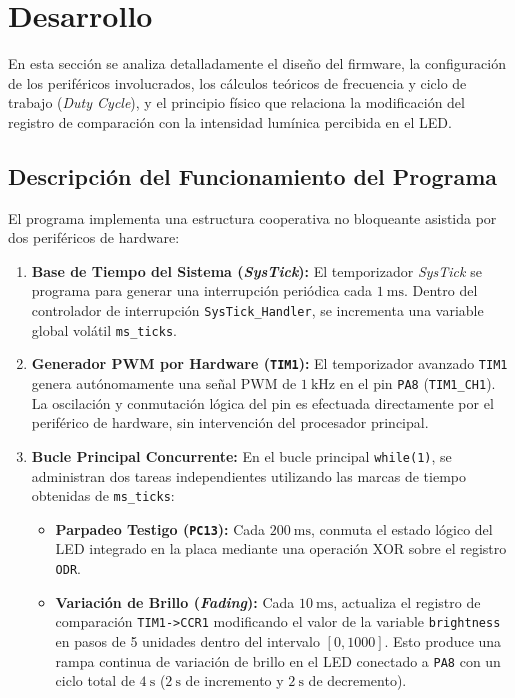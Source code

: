 \chapter{Desarrollo}
\label{ch.ej5:desarrollo}

En esta sección se analiza detalladamente el diseño del firmware, la configuración de los periféricos involucrados,
los cálculos teóricos de frecuencia y ciclo de trabajo (\textit{Duty Cycle}), y el principio físico que relaciona la
modificación del registro de comparación con la intensidad lumínica percibida en el LED.

\section{Descripción del Funcionamiento del Programa}
\label{sec.ej5:funcionamiento}

El programa implementa una estructura cooperativa no bloqueante asistida por dos periféricos de hardware:
\begin{enumerate}
    \item \textbf{Base de Tiempo del Sistema (\textit{SysTick}):} El temporizador \textit{SysTick} se programa para
    generar una interrupción periódica cada $\qty{1}{\ms}$. Dentro del controlador de interrupción
    \lstinline{SysTick_Handler}, se incrementa una variable global volátil \lstinline{ms_ticks}.
    \item \textbf{Generador PWM por Hardware (\texttt{TIM1}):} El temporizador avanzado \texttt{TIM1} genera autónomamente
    una señal PWM de $\qty{1}{\kHz}$ en el pin \texttt{PA8} (\texttt{TIM1\_CH1}). La oscilación y conmutación lógica
    del pin es efectuada directamente por el periférico de hardware, sin intervención del procesador principal.
    \item \textbf{Bucle Principal Concurrente:} En el bucle principal \lstinline{while(1)}, se administran dos tareas
    independientes utilizando las marcas de tiempo obtenidas de \lstinline{ms_ticks}:
    \begin{itemize}
        \item \textbf{Parpadeo Testigo (\texttt{PC13}):} Cada $\qty{200}{\ms}$, conmuta el estado lógico del LED
        integrado en la placa mediante una operación XOR sobre el registro \lstinline{ODR}.
        \item \textbf{Variación de Brillo (\textit{Fading}):} Cada $\qty{10}{\ms}$, actualiza el registro de comparación
        \lstinline{TIM1->CCR1} modificando el valor de la variable \lstinline{brightness} en pasos de 5 unidades dentro
        del intervalo $[0, 1000]$. Esto produce una rampa continua de variación de brillo en el LED conectado a
        \texttt{PA8} con un ciclo total de $\qty{4}{\s}$ ($\qty{2}{\s}$ de incremento y $\qty{2}{\s}$ de decremento).
    \end{itemize}
\end{enumerate}

